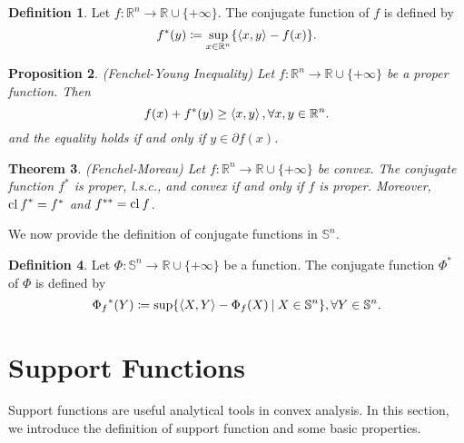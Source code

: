 \documentclass[a4paper,11pt, oneside]{book}
\newtheorem{thm}{Theorem}[section]
\newtheorem{prop}[thm]{Proposition}
\theoremstyle{definition}
\newtheorem{dfn}[thm]{Definition}
\newcommand{\RealNumberSet}{\mathbb{R}}
\newcommand{\NDemenstionalRealEuclideanSpace}{\mathbb{R}^n}
\newcommand{\NDemenstionalRealSymmetricMatrixSpace}{\mathbb{S}^n}
\newcommand{\Closure}[1]{\text{\rm cl\:${#1}$}} %
\newcommand{\InnerProduct}[2]{\left\langle {#1},{#2}\right\rangle} %
\newcommand{\ExtendedRealValuedFunction}[2]{{#1}: {#2} \to \RealNumberSet \cup \{+\infty\}}
\newcommand{\ConjugateFunction}[1]{{#1}^*}
\begin{document}
\begin{dfn}
  Let $\ExtendedRealValuedFunction{f}{\NDemenstionalRealEuclideanSpace}$. The conjugate function of $f$ is defined by
  \begin{equation}
    \ConjugateFunction{f}(y) \coloneqq \sup_{x \in \NDemenstionalRealEuclideanSpace} \{ \InnerProduct{x}{y} - f(x) \}. \notag
  \end{equation}
\end{dfn}

\begin{prop}{(Fenchel-Young Inequality)}
  Let $\ExtendedRealValuedFunction{f}{\NDemenstionalRealEuclideanSpace}$ be a proper function. Then
  \begin{equation}
    f(x) + \ConjugateFunction{f}(y) \geq \InnerProduct{x}{y}, \forall x,y \in \NDemenstionalRealEuclideanSpace. \notag
  \end{equation}
  and the equality holds if and only if $y \in \partial f(x)$.
\end{prop}

\begin{thm}{(Fenchel-Moreau)}
  Let $\ExtendedRealValuedFunction{f}{\NDemenstionalRealEuclideanSpace}$ be convex. The conjugate function $\ConjugateFunction{f}$ is proper, l.s.c., and convex if and only if $f$ is proper. Moreover, $\ConjugateFunction{\Closure{f}} = \ConjugateFunction{f}$ and $f^{**} = \Closure{f}$.
\end{thm}

We now provide the definition of conjugate functions in $\NDemenstionalRealSymmetricMatrixSpace$.

\begin{dfn}
  Let $\ExtendedRealValuedFunction{\Phi}{\NDemenstionalRealSymmetricMatrixSpace}$ be a function. The conjugate function $\ConjugateFunction{\Phi}$ of $\Phi$ is defined by
  \begin{equation}
    {\Phi_{f}}^* (Y) \coloneqq \sup \{\InnerProduct{X}{Y} - \Phi_{f} (X) \:|\: X \in \NDemenstionalRealSymmetricMatrixSpace\}, \forall Y \in \NDemenstionalRealSymmetricMatrixSpace. \notag
  \end{equation}
\end{dfn}

\section{Support Functions}

Support functions are useful analytical tools in convex analysis. In this section, we introduce the definition of support function and some basic properties.
\end{document}
